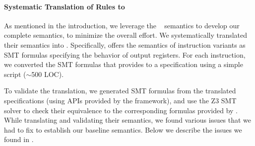 %

\paragraph{Systematic Translation of \Strata Rules to \K}
%
As mentioned in the introduction, we leverage the \Strata~\cite{Heule2016a} semantics to develop our complete semantics, to minimize the overall effort.
We systematically translated their semantics into \K.
%
Specifically, \Strata offers the semantics of \strataWithDupIS{} instruction variants as SMT formulas specifying the behavior of output registers.
For each instruction, we converted the SMT formulas that \Strata provides to a \K specification using a simple script ($\sim$500 LOC).

To validate the translation, we generated SMT formulas from the translated \K specifications (using APIs provided by the \K framework), and use the Z3 SMT solver to check their equivalence to the corresponding formulas provided by \Strata.
%
While translating and validating their semantics, we found various issues that we had to fix to establish our baseline semantics.
%
Below we describe the issues we found in \Strata.%








